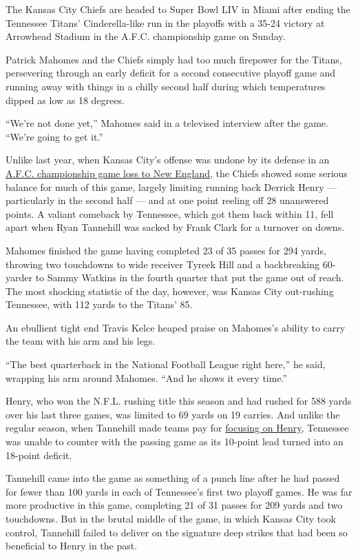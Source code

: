 The Kansas City Chiefs are headed to Super Bowl LIV in Miami after
ending the Tennessee Titans' Cinderella-like run in the playoffs with a
35-24 victory at Arrowhead Stadium in the A.F.C. championship game on
Sunday.

Patrick Mahomes and the Chiefs simply had too much firepower for the
Titans, persevering through an early deficit for a second consecutive
playoff game and running away with things in a chilly second half during
which temperatures dipped as low as 18 degrees.

``We're not done yet,'' Mahomes said in a televised interview after the
game. ``We're going to get it.''

Unlike last year, when Kansas City's offense was undone by its defense
in an
\href{https://www.nytimes3xbfgragh.onion/2018/01/21/sports/afc-championship-patriots-jaguars.html}{A.F.C.
championship game loss to New England}, the Chiefs showed some serious
balance for much of this game, largely limiting running back Derrick
Henry --- particularly in the second half --- and at one point reeling
off 28 unanswered points. A valiant comeback by Tennessee, which got
them back within 11, fell apart when Ryan Tannehill was sacked by Frank
Clark for a turnover on downs.

Mahomes finished the game having completed 23 of 35 passes for 294
yards, throwing two touchdowns to wide receiver Tyreek Hill and a
backbreaking 60-yarder to Sammy Watkins in the fourth quarter that put
the game out of reach. The most shocking statistic of the day, however,
was Kansas City out-rushing Tennessee, with 112 yards to the Titans' 85.

An ebullient tight end Travis Kelce heaped praise on Mahomes's ability
to carry the team with his arm and his legs.

``The best quarterback in the National Football League right here,'' he
said, wrapping his arm around Mahomes. ``And he shows it every time.''

Henry, who won the N.F.L. rushing title this season and had rushed for
588 yards over his last three games, was limited to 69 yards on 19
carries. And unlike the regular season, when Tannehill made teams pay
for
\href{https://www.nytimes3xbfgragh.onion/2020/01/16/sports/derrick-henry-titans-playoffs.html}{focusing
on Henry}, Tennessee was unable to counter with the passing game as its
10-point lead turned into an 18-point deficit.

Tannehill came into the game as something of a punch line after he had
passed for fewer than 100 yards in each of Tennessee's first two playoff
games. He was far more productive in this game, completing 21 of 31
passes for 209 yards and two touchdowns. But in the brutal middle of the
game, in which Kansas City took control, Tannehill failed to deliver on
the signature deep strikes that had been so beneficial to Henry in the
past.

